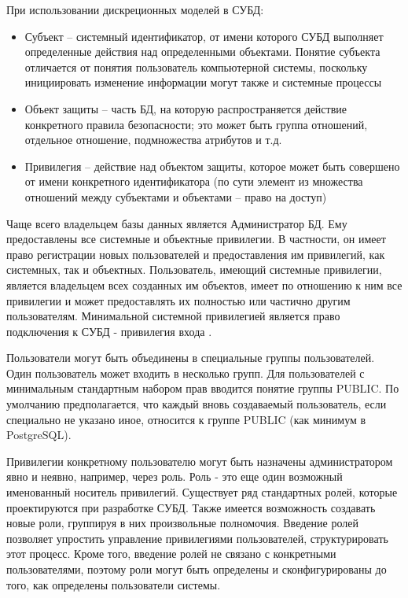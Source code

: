 {При использовании дискреционных моделей в СУБД:
\begin{itemize}
    \item Субъект -- системный идентификатор, от имени которого СУБД выполняет определенные действия над 
    определенными объектами. Понятие субъекта отличается от понятия пользователь компьютерной системы, 
    поскольку инициировать изменение информации могут также и системные процессы
    \item Объект защиты -- часть БД, на которую распространяется действие конкретного правила безопасности; 
    это может быть группа отношений, отдельное отношение, подмножества атрибутов и т.д.
    \item Привилегия -- действие над объектом защиты, которое может быть совершено от имени конкретного 
    идентификатора (по сути элемент из множества отношений между субъектами и объектами -- право на доступ)
\end{itemize}

Чаще всего владельцем базы данных является Администратор БД. Ему предоставлены все системные и объектные 
привилегии. В частности, он имеет право регистрации новых пользователей и предоставления им привилегий, как 
системных, так и объектных. Пользователь, имеющий системные привилегии, является владельцем всех созданных им
объектов, имеет по отношению к ним все привилегии и может предоставлять их полностью или частично другим 
пользователям. Минимальной системной привилегией является право подключения к СУБД - привилегия входа 
\autocite{Skakun}. 

Пользователи могут быть объединены в специальные группы пользователей. Один пользователь может входить в 
несколько групп. Для пользователей с минимальным стандартным набором прав вводится понятие группы PUBLIC. 
По умолчанию предполагается, что каждый вновь создаваемый пользователь, если специально не указано иное, 
относится к группе PUBLIC (как минимум в PostgreSQL).

Привилегии конкретному пользователю могут быть назначены администратором явно и неявно, например, через роль. 
Роль - это еще один возможный именованный носитель привилегий. Существует ряд стандартных ролей, которые 
проектируются при разработке СУБД. Также имеется возможность создавать новые роли, группируя в них произвольные 
полномочия. Введение ролей позволяет упростить управление привилегиями пользователей, структурировать этот 
процесс. Кроме того, введение ролей не связано с конкретными пользователями, поэтому роли могут быть определены 
и сконфигурированы до того, как определены пользователи системы.

}
